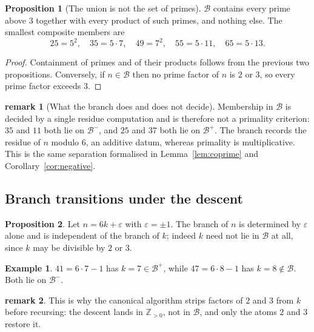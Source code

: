 \documentclass[11pt]{article}
\theoremstyle{definition}
\newtheorem{proposition}{Proposition}
\newtheorem{example}{Example}
\newtheorem{remark}{remark}
\begin{document}
\begin{proposition}[The union is not the set of primes]
$\mathcal{B}$ contains every prime above $3$ together with every product of
such primes, and nothing else. The smallest composite members are
\[
  25 = 5^2, \quad 35 = 5\cdot 7, \quad 49 = 7^2, \quad
  55 = 5 \cdot 11, \quad 65 = 5\cdot 13 .
\]
\end{proposition}

\begin{proof}
Containment of primes and of their products follows from the previous two
propositions. Conversely, if $n \in \mathcal{B}$ then no prime factor of $n$
is $2$ or $3$, so every prime factor exceeds $3$.
\end{proof}

\begin{remark}[What the branch does and does not decide]
Membership in $\mathcal{B}$ is decided by a single residue computation and is
therefore not a primality criterion: $35$ and $11$ both lie on
$\mathcal{B}^-$, and $25$ and $37$ both lie on $\mathcal{B}^+$. The branch
records the residue of $n$ modulo $6$, an additive datum, whereas primality is
multiplicative. This is the same separation formalised in
Lemma~\ref{lem:coprime} and Corollary~\ref{cor:negative}.
\end{remark}

\subsection{Branch transitions under the descent}

\begin{proposition}
Let $n = 6k+\varepsilon$ with $\varepsilon = \pm1$. The branch of $n$ is
determined by $\varepsilon$ alone and is independent of the branch of $k$;
indeed $k$ need not lie in $\mathcal{B}$ at all, since $k$ may be divisible by
$2$ or $3$.
\end{proposition}

\begin{example}
$41 = 6\cdot 7 - 1$ has $k = 7 \in \mathcal{B}^+$, while
$47 = 6 \cdot 8 - 1$ has $k = 8 \notin \mathcal{B}$. Both lie on
$\mathcal{B}^-$.
\end{example}

\begin{remark}
This is why the canonical algorithm strips factors of $2$ and $3$ from $k$
before recursing: the descent lands in $\mathbb{Z}_{>0}$, not in
$\mathcal{B}$, and only the atoms $2$ and $3$ restore it.
\end{remark}
\end{document}
